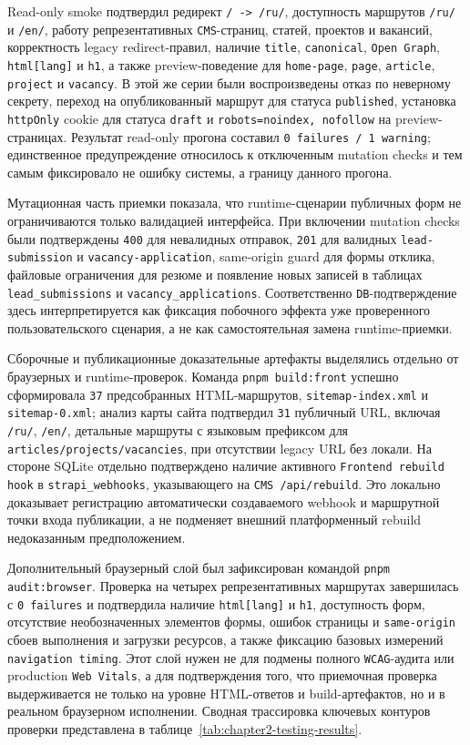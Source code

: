 Read-only smoke подтвердил редирект \texttt{/ -> /ru/}, доступность маршрутов
\texttt{/ru/} и \texttt{/en/}, работу репрезентативных \texttt{CMS}-страниц, статей,
проектов и вакансий, корректность legacy redirect-правил, наличие \texttt{title},
\texttt{canonical}, \texttt{Open Graph}, \texttt{html[lang]} и \texttt{h1}, а также
preview-поведение для \texttt{home-page}, \texttt{page}, \texttt{article},
\texttt{project} и \texttt{vacancy}. В этой же серии были воспроизведены отказ по
неверному секрету, переход на опубликованный маршрут для статуса
\texttt{published}, установка \texttt{httpOnly} cookie для статуса \texttt{draft} и
\texttt{robots=noindex, nofollow} на preview-страницах. Результат read-only прогона
составил \texttt{0 failures / 1 warning}; единственное предупреждение относилось к
отключенным mutation checks и тем самым фиксировало не ошибку системы, а границу данного
прогона.

Мутационная часть приемки показала, что runtime-сценарии публичных форм не
ограничиваются только валидацией интерфейса. При включении mutation checks были
подтверждены \texttt{400} для невалидных отправок, \texttt{201} для валидных
\texttt{lead-submission} и \texttt{vacancy-application}, same-origin guard для формы
отклика, файловые ограничения для резюме и появление новых записей в таблицах
\texttt{lead\_submissions} и \texttt{vacancy\_applications}. Соответственно
\texttt{DB}-подтверждение здесь интерпретируется как фиксация побочного эффекта уже проверенного пользовательского
сценария, а не как самостоятельная замена runtime-приемки.

Сборочные и публикационные доказательные артефакты выделялись отдельно от
браузерных и runtime-проверок.
Команда \texttt{pnpm build:front} успешно сформировала \texttt{37} предсобранных
HTML-маршрутов, \texttt{sitemap-index.xml} и \texttt{sitemap-0.xml}; анализ карты сайта
подтвердил \texttt{31} публичный URL, включая \texttt{/ru/}, \texttt{/en/},
детальные маршруты с языковым префиксом для \texttt{articles/projects/vacancies}, при
отсутствии legacy URL без локали. На стороне SQLite
отдельно подтверждено наличие активного \texttt{Frontend rebuild hook} в
\texttt{strapi\_webhooks}, указывающего на \texttt{CMS /api/rebuild}. Это локально
доказывает регистрацию автоматически создаваемого webhook и маршрутной точки входа публикации, а не
подменяет внешний платформенный rebuild недоказанным предположением.

Дополнительный браузерный слой был зафиксирован командой \texttt{pnpm audit:browser}.
Проверка на четырех репрезентативных маршрутах завершилась с \texttt{0 failures} и
подтвердила наличие \texttt{html[lang]} и \texttt{h1}, доступность форм, отсутствие
необозначенных элементов формы, ошибок страницы и \texttt{same-origin} сбоев выполнения
и загрузки ресурсов, а также фиксацию базовых измерений \texttt{navigation timing}. Этот слой нужен не для
подмены полного \texttt{WCAG}-аудита или production \texttt{Web Vitals}, а для
подтверждения того, что приемочная проверка выдерживается не только на уровне
HTML-ответов и build-артефактов, но и в реальном браузерном исполнении. Сводная трассировка ключевых
контуров проверки представлена в таблице~\ref{tab:chapter2-testing-results}.

